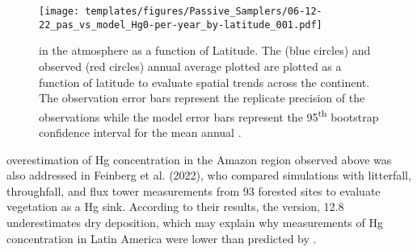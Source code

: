 \begin{figure}[H]
  \texttt{[image: templates/figures/Passive\_Samplers/06-12-22\_pas\_vs\_model\_Hg0-per-year\_by-latitude\_001.pdf]}
  \caption{\hg in the atmosphere as a function of Latitude. The \on (blue circles) and observed (red circles) annual average \hg plotted are plotted as a function of latitude to evaluate spatial trends across the continent. The observation error bars represent the replicate precision of the observations while the model error bars represent the 95\textsuperscript{th} bootstrap confidence interval for the mean annual \hg.}
  \label{fig:06-12-22_pas_vs_model_Hg0-per-year_by-latitude_001}
  \centering
  
\end{figure}
\FloatBarrier
\begin{flushleft}
    \gcs overestimation of Hg concentration in the Amazon region observed above was also addressed in Feinberg et al. (2022), who compared simulations with litterfall, throughfall, and flux tower measurements from 93 forested sites to evaluate vegetation as a Hg sink. According to their results, the \gc version, 12.8 underestimates \hg dry deposition, which may explain why measurements of Hg concentration in Latin America were lower than predicted by \gc. 
    
\end{flushleft}


                        
